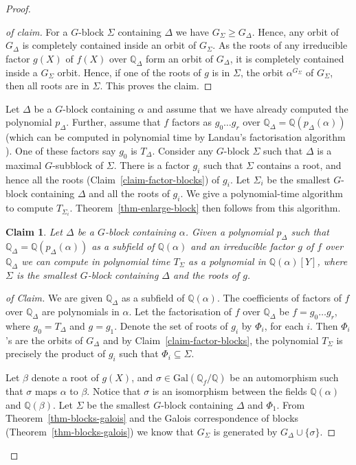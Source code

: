 \documentclass[prodmod,acmtalg]{acmsmall}
\newtheorem{claim}[theorem]{Claim}
\newcommand{\Gal}[1]{{\ensuremath{\mathrm{Gal}\left(#1\right)}}}
\newcommand{\Q}{\ensuremath{\mathbb{Q}}}
\begin{document}
\begin{proof}
\begin{proof}[of claim]
  For a $G$-block $\Sigma$ containing $\Delta$ we have $G_\Sigma \geq
  G_\Delta$. Hence, any orbit of $G_\Delta$ is completely contained
  inside an orbit of $G_\Sigma$. As the roots of any irreducible
  factor $g(X)$ of $f(X)$ over $\Q_\Delta$ form an orbit of
  $G_\Delta$, it is completely contained inside a $G_\Sigma$
  orbit. Hence, if one of the roots of $g$ is in $\Sigma$, the orbit
  $\alpha^{G_\Sigma}$ of $G_\Sigma$, then all roots are in
  $\Sigma$. This proves the claim.
\end{proof}

Let $\Delta$ be a $G$-block containing $\alpha$ and assume that we
have already computed the polynomial $p_\Delta$. Further, assume that
$f$ factors as $g_0\ldots g_r$ over $\Q_\Delta=\Q(p_\Delta(\alpha))$
(which can be computed in polynomial time by Landau's factorisation
algorithm \cite{landau85factoring}). One of these factors say $g_0$ is
$T_\Delta$. Consider any $G$-block $\Sigma$ such that $\Delta$ is a
maximal $G$-subblock of $\Sigma$.  There is a factor $g_i$ such that
$\Sigma$ contains a root, and hence all the roots
(Claim~\ref{claim-factor-blocks}) of $g_i$.  Let $\Sigma_i$ be the
smallest $G$-block containing $\Delta$ and all the roots of $g_i$.  We
give a polynomial-time algorithm to compute $T_{\Sigma_i}$.
Theorem~\ref{thm-enlarge-block} then follows from this algorithm.

\begin{claim}\label{claim-enlarge-block}
  Let $\Delta$ be a $G$-block containing $\alpha$. Given a polynomial
  $p_\Delta$ such that $\Q_\Delta=\Q(p_\Delta(\alpha))$ as a subfield
  of $\Q(\alpha)$ and an irreducible factor $g$ of $f$ over
  $\Q_\Delta$ we can compute in polynomial time $T_\Sigma$ as a
  polynomial in $\Q(\alpha)[Y]$, where $\Sigma$ is the smallest
  $G$-block containing $\Delta$ and the roots of $g$.
\end{claim}
\begin{proof}[of Claim]
  We are given $\Q_\Delta$ as a subfield of $\Q(\alpha)$. The
  coefficients of factors of $f$ over $\Q_\Delta$ are polynomials in
  $\alpha$. Let the factorisation of $f$ over $\Q_\Delta$ be $f=g_0
  \ldots g_r$, where $g_0 = T_\Delta$ and $g=g_1$.  Denote the set of
  roots of $g_i$ by $\Phi_i$, for each $i$. Then $\Phi_i$'s are the
  orbits of $G_\Delta$ and by Claim~\ref{claim-factor-blocks}, the
  polynomial $T_\Sigma$ is precisely the product of $g_i$ such that
  $\Phi_i\subseteq \Sigma$.

  Let $\beta$ denote a root of $g(X)$, and $\sigma \in \Gal{\Q_f/\Q}$
  be an automorphism such that $\sigma$ maps $\alpha$ to
  $\beta$. Notice that $\sigma$ is an isomorphism between the fields
  $\Q(\alpha)$ and $\Q(\beta)$.  Let $\Sigma$ be the smallest
  $G$-block containing $\Delta$ and $\Phi_1$. {From}
  Theorem~\ref{thm-blocks-galois} and the Galois correspondence of
  blocks (Theorem~\ref{thm-blocks-galois}) we know that $G_\Sigma$ is
  generated by $G_\Delta\cup\{\sigma\}$.


\end{proof}
\end{proof}
\end{document}
